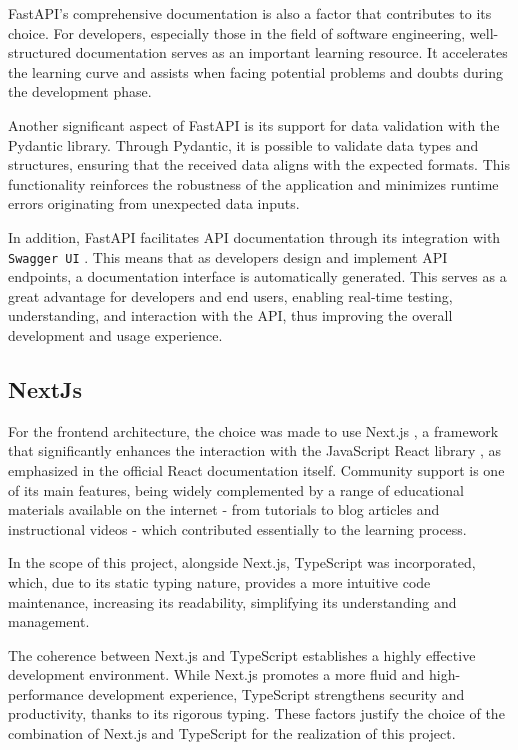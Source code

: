 FastAPI's comprehensive documentation is also a factor that contributes to its choice. For developers, especially those in the field of software engineering, well-structured documentation serves as an important learning resource. It accelerates the learning curve and assists when facing potential problems and doubts during the development phase.

Another significant aspect of FastAPI is its support for data validation with the Pydantic library. Through Pydantic, it is possible to validate data types and structures, ensuring that the received data aligns with the expected formats. This functionality reinforces the robustness of the application and minimizes runtime errors originating from unexpected data inputs.

In addition, FastAPI facilitates API documentation through its integration with \texttt{Swagger UI} \cite{swaggerui2023}. This means that as developers design and implement API endpoints, a documentation interface is automatically generated. This serves as a great advantage for developers and end users, enabling real-time testing, understanding, and interaction with the API, thus improving the overall development and usage experience.

\subsection{NextJs}
For the frontend architecture, the choice was made to use Next.js \cite{nextjsDocs}, a framework that significantly enhances the interaction with the JavaScript React library \cite{reactDocs}, as emphasized in the official React documentation itself. Community support is one of its main features, being widely complemented by a range of educational materials available on the internet - from tutorials to blog articles and instructional videos - which contributed essentially to the learning process.

In the scope of this project, alongside Next.js, TypeScript \cite{typescriptLang} was incorporated, which, due to its static typing nature, provides a more intuitive code maintenance, increasing its readability, simplifying its understanding and management.

The coherence between Next.js and TypeScript establishes a highly effective development environment. While Next.js promotes a more fluid and high-performance development experience, TypeScript strengthens security and productivity, thanks to its rigorous typing. These factors justify the choice of the combination of Next.js and TypeScript for the realization of this project.

